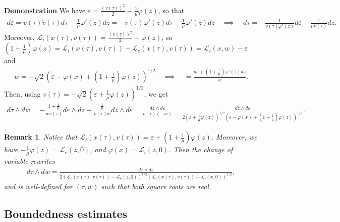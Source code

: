 \documentclass{article}
\newtheorem{remark}{Remark}[section]
\numberwithin{equation}{section}
\newcommand{\myproof}[1]{
	\noindent \textbf{Demonstration}
	{\small	#1 \hfill \qedsymbol}
}
\newcommand{\ee}{\varepsilon} %
\begin{document}
\myproof{
	We have $\ee = \frac{(v(\tau))^2}{2} - \frac{1}{\mu} \varphi(z)$, so that
	\begin{align*}
		d\ee = v(\tau) \dot{v}(\tau) d\tau - \frac{1}{\mu} \varphi'(z) dz = - v(\tau) \varphi'(z) d\tau - \frac{1}{\mu} \varphi'(z) dz
		\quad \implies \quad 
		d\tau = -\frac{1}{v(\tau) \varphi'(z)} d\ee - \frac{1}{\mu v(\tau)} dz.
	\end{align*}
	Moreover, $\mathcal{L}_i(x(\tau),v(\tau)) = \frac{(v(\tau))^2}{2} + \varphi(z)$, so $\left(1+\frac{1}{\mu}\right) \varphi(z) = \mathcal{L}_i(x(\tau),v(\tau)) - \mathcal{L}_e(x(\tau),v(\tau)) = \mathcal{L}_i(x,w) - \ee$ and
	\begin{align*}
		w = -\sqrt{2}\left(\ee - \varphi(x) + \left(1+\frac{1}{\mu}\right) \varphi(z)\right)^{1/2}
		\quad \implies \quad
		= \frac{d\ee + \left(1+\frac{1}{\mu}\right) \varphi'(z) dz}{w}.
	\end{align*}
	Then, using $v(\tau) = - \sqrt{2}\left(\ee + \frac{1}{\mu} \varphi(z)\right)^{1/2}$, we get
	\begin{align*}
		d\tau \wedge dw
		= -\frac{1+\frac{1}{\mu}}{w v(\tau)} d\ee \wedge dz - \frac{\frac{1}{\mu}}{v(\tau) w} dz \wedge d\ee
		= \frac{dz \wedge d\ee}{v(\tau) (-w)} 
		= \frac{dz \wedge d\ee}{2 \left(\ee + \frac{1}{\mu} \varphi(z)\right)^{1/2} \left(\ee - \varphi(x) + \left(1+\frac{1}{\mu}\right) \varphi(z)\right)^{1/2}}.
	\end{align*}
}

\begin{remark}\label{rem:magic_change_welldef}
	Notice that $\mathcal{L}_i(x(\tau),v(\tau)) = \ee + \left(1+\frac{1}{\mu}\right) \varphi(z)$. Moreover, we have $-\frac{1}{\mu} \varphi(z) = \mathcal{L}_e(z,0)$, and $\varphi(x) = \mathcal{L}_i(z,0)$. Then the change of variable rewrites
	\begin{align*}
		d\tau \wedge dw = \frac{dz \wedge d\ee}{2\left(\mathcal{L}_e(x(\tau),v(\tau)) - \mathcal{L}_e(z,0)\right)^{1/2} \left(\mathcal{L}_i(x(\tau),v(\tau)) - \mathcal{L}_i(x,0)\right)^{1/2}},
	\end{align*}
	and is well-defined for $(\tau,w)$ such that both square roots are real.
\end{remark}

\subsection{Boundedness estimates}
\end{document}
